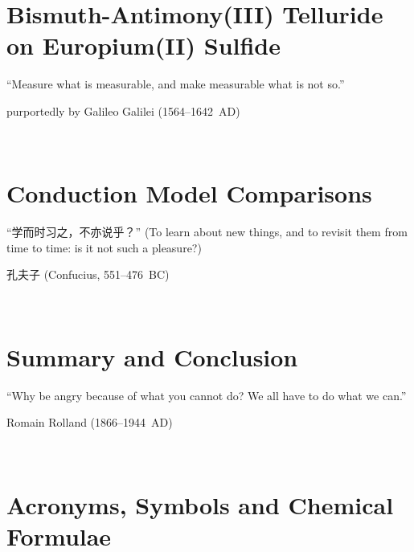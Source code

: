 ﻿\documentclass{report}
\begin{document}
\chapter{Bismuth-Antimony(III) Telluride on Europium(II) Sulfide}\label{ch:bilayer2018}
\begin{refsection}
\epigraph{``Measure what is measurable, and make measurable what is not so.''}{purportedly by Galileo Galilei (1564--1642~AD)}~\\
    
    \printbibliography[heading=subbibintoc, title=References for Chapter~\thechapter]
\end{refsection}

\chapter{Conduction Model Comparisons}\label{ch:models}
\begin{refsection}
    \begin{CJK*}{UTF8}{gkai}
    \epigraph{``学而时习之，不亦说乎？'' (To learn about new things, and to revisit them from time to time: is it not such a pleasure?)}{孔夫子 (Confucius, 551--476~BC)}~\\
    \end{CJK*}
    
    \printbibliography[heading=subbibintoc, title=References for Chapter~\thechapter]
\end{refsection}

\chapter{Summary and Conclusion}\label{ch:conclusion}
\epigraph{``Why be angry because of what you cannot do? We all have to do what we can.''}{Romain Rolland (1866--1944~AD)}~\\
    
    \printbibliography[heading=subbibintoc, title=References for Chapter~\thechapter]
\appendix
%
%
\chapter{Acronyms, Symbols and Chemical Formulae}
    
\end{document}
